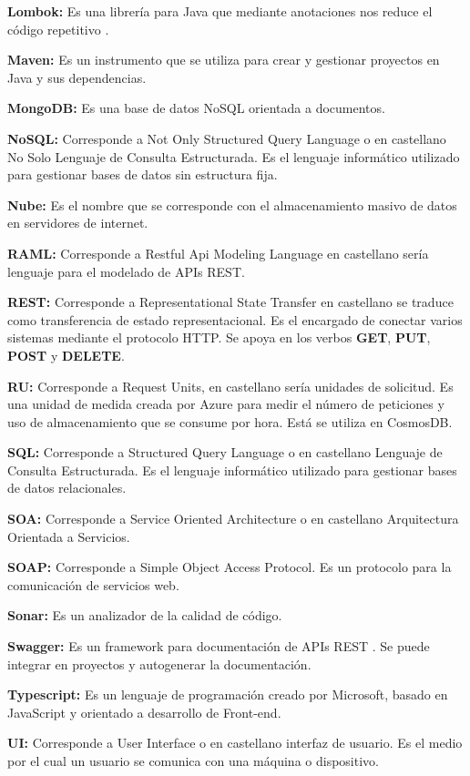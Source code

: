 \documentclass[12pt]{report} %
\begin{document}
\textbf{Lombok:} Es una librería para Java que mediante anotaciones nos reduce el código repetitivo \cite{lombok}. 

\textbf{Maven:} Es un instrumento que se utiliza para crear y gestionar proyectos en Java y sus dependencias.

\textbf{MongoDB:} Es una base de datos NoSQL orientada a documentos.

\textbf{NoSQL:} Corresponde a Not Only Structured Query Language o en castellano No Solo Lenguaje de Consulta Estructurada. Es el lenguaje informático utilizado para gestionar bases de datos sin estructura fija.

\textbf{Nube:} Es el nombre que se corresponde con el almacenamiento masivo de datos en servidores de internet.

\textbf{RAML:} Corresponde a Restful Api Modeling Language en castellano sería lenguaje para el modelado de APIs REST.

\textbf{REST:} Corresponde a Representational State Transfer en castellano se traduce como transferencia de estado representacional. Es el encargado de conectar varios sistemas mediante el protocolo HTTP. Se apoya en los verbos \textbf{GET}, \textbf{PUT}, \textbf{POST} y  \textbf{DELETE}.

\textbf{RU:} Corresponde a Request Units, en castellano sería unidades de solicitud. Es una unidad de medida creada por Azure para medir el número de peticiones y uso de almacenamiento que se consume por hora. Está se utiliza en CosmosDB.

\textbf{SQL:} Corresponde a Structured Query Language o en castellano Lenguaje de Consulta Estructurada. Es el lenguaje informático utilizado para gestionar bases de datos relacionales.

\textbf{SOA:} Corresponde a Service Oriented Architecture o en castellano Arquitectura Orientada a Servicios.

\textbf{SOAP:} Corresponde a Simple Object Access Protocol. Es un protocolo para la comunicación de servicios web.

\textbf{Sonar:} Es un analizador de la calidad de código.

\textbf{Swagger:} Es un framework para documentación de APIs REST \cite{swagger}. Se puede integrar en proyectos y autogenerar la documentación.

\textbf{Typescript:} Es un lenguaje de programación creado por Microsoft, basado en JavaScript y orientado a desarrollo de Front-end.

\textbf{UI:} Corresponde a User Interface o en castellano interfaz de usuario. Es el medio por el cual un usuario se comunica con una máquina o dispositivo.
\end{document}
